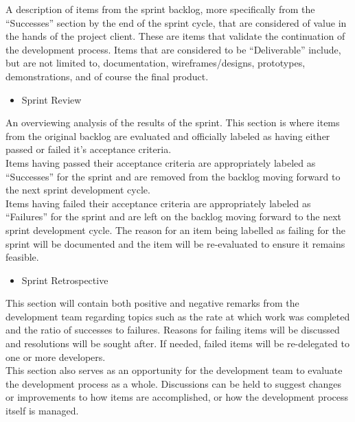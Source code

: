         A description of items from the sprint backlog, more specifically from the ``Successes'' section by the end of the
        sprint cycle, that are considered of value in the hands of the project client.  These are items that validate the 
        continuation of the development process.  Items that are considered to be ``Deliverable'' include, but are not 
        limited to, documentation, wireframes/designs, prototypes, demonstrations, and of course the final product.\\

    \begin{itemize} \item Sprint Review \end{itemize}
       
        An overviewing analysis of the results of the sprint.  This section is where items from the original backlog
        are evaluated and officially labeled as having either passed or failed it's acceptance criteria.\\

        Items having passed their acceptance criteria are appropriately labeled as ``Successes'' for the sprint and are 
        removed from the backlog moving forward to the next sprint development cycle.\\

        Items having failed their acceptance criteria are appropriately labeled as ``Failures'' for the sprint and are
        left on the backlog moving forward to the next sprint development cycle.  The reason for an item being labelled
        as failing for the sprint will be documented and  the item will be re-evaluated to ensure it remains feasible.\\  

    \begin{itemize} \item Sprint Retrospective \end{itemize}
        
        This section will contain both positive and negative remarks from the development team regarding topics such as 
        the rate at which work was completed and the ratio of successes to failures.  Reasons for failing items will be
        discussed and resolutions will be sought after.  If needed, failed items will be re-delegated to one or more 
        developers.\\

        This section also serves as an opportunity for the development team to evaluate the development process as a whole.
        Discussions can be held to suggest changes or improvements to how items are accomplished, or how the development
        process itself is managed.


